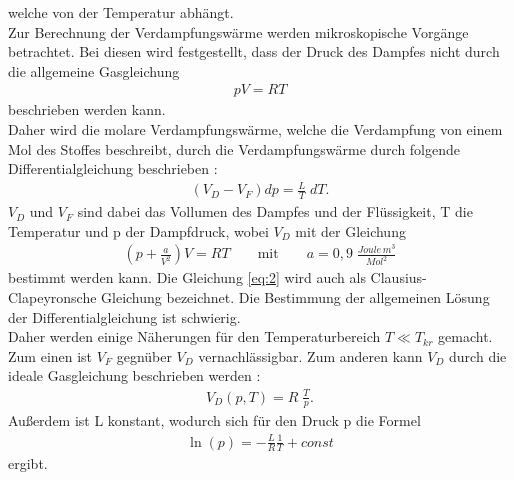 welche von der Temperatur abhängt.\\
Zur Berechnung der Verdampfungswärme werden mikroskopische Vorgänge betrachtet. Bei diesen
wird festgestellt, dass der Druck des Dampfes nicht durch die allgemeine Gasgleichung \cite{V203}
\begin{align}
    pV=RT \label{eq:1}
\end{align}
beschrieben werden kann. \\
Daher wird die molare Verdampfungswärme, welche die Verdampfung von einem Mol des Stoffes
beschreibt, durch die Verdampfungswärme durch folgende Differentialgleichung beschrieben \cite{V203}:
\begin{align}
    \left(V_D - V_F\right)dp=\frac{L}{T} \; dT \label{eq:2}.
\end{align}
$V_D$ und $V_F$ sind dabei das Vollumen des Dampfes und der Flüssigkeit, T die Temperatur und p der Dampfdruck,
wobei $V_D$ mit der Gleichung \cite{V203}
\begin{align}
    \left(p+\frac{a}{V^2}\right)V=RT \qquad \text{mit} \qquad a=0,9 \;\frac{Joule\,m^3}{Mol^2} \label{eq:3}
\end{align}
bestimmt werden kann.
Die Gleichung \eqref{eq:2} wird auch als Clausius-Clapeyronsche Gleichung bezeichnet.
Die Bestimmung der allgemeinen Lösung der Differentialgleichung ist schwierig. \\
Daher werden einige Näherungen für den Temperaturbereich $T \ll T_{kr}$ gemacht.
Zum einen ist $V_F$ gegnüber $V_D$ vernachlässigbar.
Zum anderen kann $V_D$ durch die ideale Gasgleichung beschrieben werden \cite{V203}:
\begin{align}
    V_D(p,T)=R \; \frac{T}{p} \label{eq:4}.
\end{align}
Außerdem ist L konstant, wodurch sich für den Druck p die Formel \cite{V203}
\begin{align}
    \ln(p)=- \frac{L}{R} \frac{1}{T}+const \label{eq:5}
\end{align}
ergibt.
\newpage


